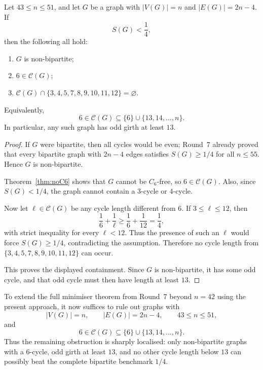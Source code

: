 \begin{corollary}\label{cor:sharp-obstruction}
Let $43\le n\le 51$, and let $G$ be a graph with $|V(G)|=n$ and $|E(G)|=2n-4$.
If
\[
S(G)<\frac14,
\]
then the following all hold:
\begin{enumerate}
\item $G$ is non-bipartite;
\item $6\in\mathcal C(G)$;
\item $\mathcal C(G)\cap\{3,4,5,7,8,9,10,11,12\}=\varnothing$.
\end{enumerate}
Equivalently,
\[
6\in\mathcal C(G)\subseteq \{6\}\cup\{13,14,\dots,n\}.
\]
In particular, any such graph has odd girth at least $13$.
\end{corollary}

\begin{proof}
If $G$ were bipartite, then all cycles would be even; Round~7 already proved that every bipartite graph with $2n-4$ edges satisfies $S(G)\ge 1/4$ for all $n\le 55$.
Hence $G$ is non-bipartite.

Theorem~\ref{thm:noC6} shows that $G$ cannot be $C_6$-free, so $6\in\mathcal C(G)$.
Also, since $S(G)<1/4$, the graph cannot contain a $3$-cycle or $4$-cycle.

Now let $\ell\in\mathcal C(G)$ be any cycle length different from $6$.
If $3\le \ell\le 12$, then
\[
\frac16+\frac1\ell\ge \frac16+\frac1{12}=\frac14,
\]
with strict inequality for every $\ell<12$.
Thus the presence of such an $\ell$ would force $S(G)\ge 1/4$, contradicting the assumption.
Therefore no cycle length from $\{3,4,5,7,8,9,10,11,12\}$ can occur.

This proves the displayed containment.  Since $G$ is non-bipartite, it has some odd cycle, and that odd cycle must then have length at least $13$.
\end{proof}

\begin{remark}[What remains to settle the full line through $n=51$]
To extend the full minimiser theorem from Round~7 beyond $n=42$ using the present approach, it now suffices to rule out graphs with
\[
|V(G)|=n,\qquad |E(G)|=2n-4,\qquad 43\le n\le 51,
\]
and
\[
6\in\mathcal C(G)\subseteq \{6\}\cup\{13,14,\dots,n\}.
\]
Thus the remaining obstruction is sharply localised: only non-bipartite graphs with a $6$-cycle, odd girth at least $13$, and no other cycle length below $13$ can possibly beat the complete bipartite benchmark $1/4$.
\end{remark}

